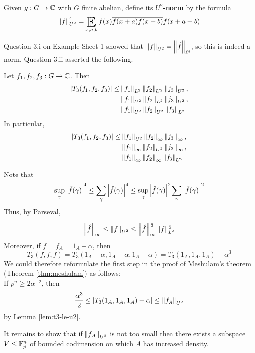 \documentclass{article}
\begin{document}
\begin{dfn}
  Given $g : G \to \mathbb C$ with $G$ finite abelian, define its {\bf $U^2$-norm} by the formula
  $$\norm f_{U^2}^4 = \E_{x, a, b} f(x) \overline{f(x + a) f(x + b)} f(x + a + b)$$
\end{dfn}

Question 3.i on Example Sheet 1 showed that $\left\lVert f\right\rVert_{U^2} = \left\lVert \hat f\right\rVert_{\ell^4}$, so this is indeed a norm. Question 3.ii asserted the following.

\begin{lem}\label{lem:t3-le-u2}
  Let $f_1, f_2, f_3 : G \to \mathbb C$. Then
  \begin{align*}
    \left\lvert T_3(f_1, f_2, f_3)\right\rvert \le
    & \left\lVert f_1\right\rVert_{L^2} \left\lVert f_2\right\rVert_{U^2} \left\lVert f_3\right\rVert_{U^2}, \\
    & \left\lVert f_1\right\rVert_{U^2} \left\lVert f_2\right\rVert_{L^2} \left\lVert f_3\right\rVert_{U^2}, \\
    & \left\lVert f_1\right\rVert_{U^2} \left\lVert f_2\right\rVert_{U^2} \left\lVert f_3\right\rVert_{L^2}
  \end{align*}
  In particular,
  \begin{align*}
    \left\lvert T_3(f_1, f_2, f_3)\right\rvert \le
    & \left\lVert f_1\right\rVert_{U^2} \left\lVert f_2\right\rVert_\infty \left\lVert f_3\right\rVert_\infty, \\
    & \left\lVert f_1\right\rVert_\infty \left\lVert f_2\right\rVert_{U^2} \left\lVert f_3\right\rVert_\infty, \\
    & \left\lVert f_1\right\rVert_\infty \left\lVert f_2\right\rVert_\infty \left\lVert f_3\right\rVert_{U^2}
  \end{align*}
\end{lem}

Note that
$$\sup_\gamma \left\lvert \hat f(\gamma)\right\rvert^4 \le \sum_\gamma \left\lvert \hat f(\gamma)\right\rvert^4 \le \sup_\gamma \left\lvert \hat f(\gamma)\right\rvert^2 \sum_\gamma \left\lvert \hat f(\gamma)\right\rvert^2$$
Thus, by Parseval,
$$\left\lVert \hat f\right\rVert_\infty \le \left\lVert f\right\rVert_{U^2} \le \left\lVert \hat f\right\rVert_\infty^{\frac 12} \left\lVert f\right\rVert_{L^2}^{\frac 12}$$
Moreover, if $f = f_A = 1_A - \alpha$, then
$$T_3(f, f, f) = T_3(1_A - \alpha, 1_A - \alpha, 1_A - \alpha) = T_3(1_A, 1_A, 1_A) - \alpha^3$$
We could therefore reformulate the first step in the proof of Meshulam's theorem (Theorem \ref{thm:meshulam}) as follows: \\
If $p^n \ge 2\alpha^{-2}$, then
$$\frac{\alpha^3}2 \le \left\lvert T_3(1_A, 1_A, 1_A) - \alpha\right\rvert \le \left\lVert f_A\right\rVert_{U^2}$$
by Lemma \ref{lem:t3-le-u2}.

\newlec 

It remains to show that if $\left\lVert f_A\right\rVert_{U^2}$ is not too small then there exists a subspace $V \le \mathbb F_p^n$ of bounded codimension on which $A$ has increased density.
\end{document}
